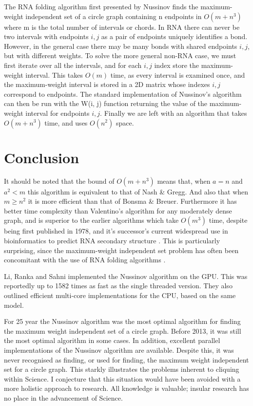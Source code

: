 \documentclass[12pt, a4paper]{article}
\begin{document}
The RNA folding algorithm first presented by Nussinov finds the maximum-weight independent set of a circle graph containing n endpoints in $O(m + n^3)$ where m is the total number of intervals or chords. In RNA there can never be two intervals with endpoints $i, j$ as a pair of endpoints uniquely identifies a bond. However, in the general case there may be many bonds with shared endpoints $i, j$, but with different weights. To solve the more general non-RNA case, we must first iterate over all the intervals, and for each $i, j$ index store the maximum-weight interval. This takes $O(m)$ time, as every interval is examined once, and the maximum-weight interval is stored in a 2D matrix whose indexes $i, j$ correspond to endpoints. The standard implementation of Nussinov’s algorithm can then be run with the W(i, j) function returning the value of the maximum-weight interval for endpoints $i, j$. Finally we are left with an algorithm that takes $O(m + n^3)$ time, and uses $O(n^2)$ space.


\section*{Conclusion}
It should be noted that the bound of $O(m + n^3)$ means that, when $a = n$ and $a^2 < m$ this algorithm is equivalent to that of Nash \& Gregg. And also that when $m \geq n^2$ it is more efficient than that of Bonsma \& Breuer. Furthermore it has better time complexity than Valentino's algorithm for any moderately dense graph, and is superior to the earlier algorithms which take $O(m^3)$ time, despite being first published in 1978, and it’s successor's current widespread use in bioinformatics to predict RNA secondary structure \cite{lorenz2011viennarna}. This is particularly surprising, since the maximum-weight independent set problem has often been concomitant with the use of RNA folding algorithms \cite{sperschneider2008knotseeker, bon2011tt2ne}.

Li, Ranka and Sahni \cite{li2013multicore} implemented the Nussinov algorithm on the GPU. This was reportedly up to 1582 times as fast as the single threaded version. They also outlined efficient multi-core implementations for the CPU, based on the same model.

For 25 year the Nussinov algorithm was the most optimal algorithm for finding the maximum weight independent set of a circle graph. Before 2013, it was still the most optimal algorithm in some cases. In addition, excellent parallel implementations of the Nussinov algorithm are available. Despite this, it was never recognised as finding, or used for finding, the maximum weight independent set for a circle graph. This starkly illustrates the problems inherent to cliquing within Science. I conjecture that this situation would have been avoided with a more holistic approach to research. All knowledge is valuable; insular research has no place in the advancement of Science.




\end{document}

